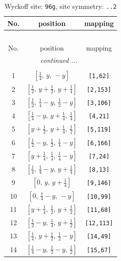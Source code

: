 \documentclass[fleqn,8pt]{jsarticle}
\begin{document}
\renewcommand{\arraystretch}{1.2}
\begin{longtable}{ccc}
\caption{Wyckoff site: {\tt 96g}, site symmetry: {\tt ..2}}
 \\
 \hline \hline
No. & position & mapping \\ \hline \endfirsthead

\multicolumn{2}{l}{\tablename\ \thetable{}} \\
 \hline \hline
No. & position & mapping \\ \hline \endhead

 \hline \hline
\multicolumn{2}{r}{\footnotesize\it continued ...} \\ \endfoot

 \hline \hline
\multicolumn{2}{r}{} \\ \endlastfoot

1 & $\left[ \frac{1}{4},\, y,\, - y \right]$ & {\tt [1,62]} \\ \hline
2 & $\left[ \frac{1}{2},\, y + \frac{1}{2},\, y + \frac{1}{4} \right]$ & {\tt [2,153]} \\ \hline
3 & $\left[ \frac{1}{2},\, \frac{1}{4} - y,\, \frac{1}{2} - y \right]$ & {\tt [3,106]} \\ \hline
4 & $\left[ \frac{1}{4} - y,\, y + \frac{1}{4},\, \frac{1}{4} \right]$ & {\tt [4,21]} \\ \hline
5 & $\left[ y + \frac{1}{2},\, y + \frac{1}{4},\, \frac{1}{2} \right]$ & {\tt [5,119]} \\ \hline
6 & $\left[ \frac{1}{2} - y,\, \frac{1}{2},\, \frac{1}{4} - y \right]$ & {\tt [6,166]} \\ \hline
7 & $\left[ y + \frac{1}{4},\, \frac{1}{4},\, \frac{1}{4} - y \right]$ & {\tt [7,24]} \\ \hline
8 & $\left[ \frac{1}{4},\, \frac{1}{4} - y,\, y + \frac{1}{4} \right]$ & {\tt [8,13]} \\ \hline
9 & $\left[ 0,\, y,\, y + \frac{1}{4} \right]$ & {\tt [9,146]} \\ \hline
10 & $\left[ 0,\, \frac{1}{4} - y,\, - y \right]$ & {\tt [10,99]} \\ \hline
11 & $\left[ y + \frac{1}{4},\, \frac{1}{2},\, y + \frac{1}{2} \right]$ & {\tt [11,68]} \\ \hline
12 & $\left[ \frac{1}{2} - y,\, \frac{1}{4},\, y + \frac{1}{2} \right]$ & {\tt [12,113]} \\ \hline
13 & $\left[ \frac{1}{4},\, y + \frac{1}{2},\, \frac{1}{2} - y \right]$ & {\tt [14,49]} \\ \hline
14 & $\left[ \frac{1}{4} - y,\, \frac{1}{2} - y,\, \frac{1}{2} \right]$ & {\tt [15,67]} \\ \hline

\end{longtable}
\end{document}
